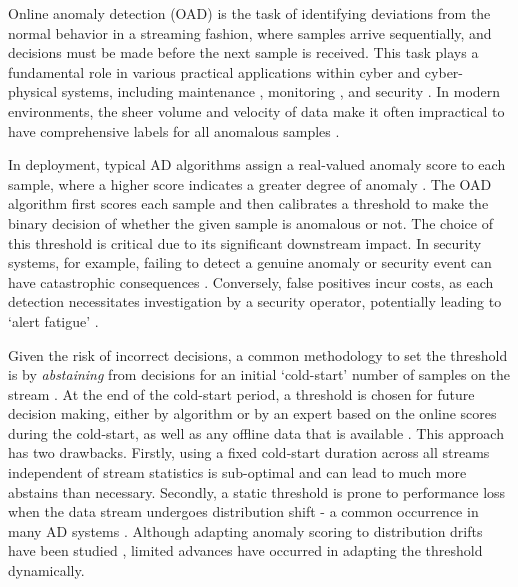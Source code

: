 Online anomaly detection (OAD) is the task of identifying deviations from the normal behavior in a streaming fashion, where samples arrive sequentially, and decisions must be made before the next sample is received. This task plays a fundamental role in various practical applications within cyber and cyber-physical systems, including maintenance \cite{khan2020industrial}, monitoring \cite{hill2010anomaly}, and security \cite{mirsky2018kitsune, lazarevic2003comparative}. In modern environments, the sheer volume and velocity of data make it often impractical to have comprehensive labels for all anomalous samples \cite{siffer2017anomaly, schmidl2022anomaly, ren2019time, audibert2020usad}.

In deployment, typical AD algorithms assign a real-valued anomaly score to each sample, where a higher score indicates a greater degree of anomaly \cite{chandola2009anomaly}. The OAD algorithm first scores each sample and then calibrates a threshold to make the binary decision of whether the given sample is anomalous or not. The choice of this threshold is critical due to its significant downstream impact. In security systems, for example, failing to detect a genuine anomaly or security event can have catastrophic consequences \cite{203674}. Conversely, false positives incur costs, as each detection necessitates investigation by a security operator, potentially leading to `alert fatigue' \cite{202751, lin2018collaborative, he2023cloudshield}.

Given the risk of incorrect decisions, a common methodology to set the threshold is by \emph{abstaining} from decisions for an initial `cold-start' number of samples on the  stream \cite{10.14778/2850583.2850593, katz2023cold}. At the end of the cold-start period, a threshold is chosen for future decision making, either by algorithm or by an expert based on the online scores during the cold-start, as well as any offline data that is available \cite{ren2019time, bhatia2021mstream,huang2022semi, li2021fluxev}. 
This approach has two drawbacks. 
Firstly, using a fixed cold-start duration across all streams independent of stream statistics is sub-optimal and can lead to much more abstains than necessary. Secondly, a static threshold is prone to performance loss when the data stream undergoes distribution shift - a common occurrence in many AD systems \cite{279982,gama2014survey}. Although adapting anomaly scoring to distribution drifts have been studied \cite{ma2018robust,bhatia2022memstream, sankararaman2022fitness}, limited advances have occurred in adapting the threshold dynamically.
%


